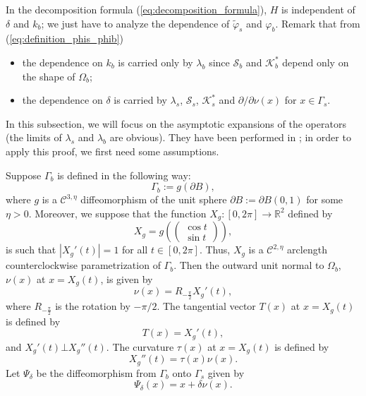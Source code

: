 \documentclass[final]{siamltex}
\numberwithin{equation}{section}
\numberwithin{figure}{section}
\numberwithin{table}{section}
\begin{document}
In the decomposition formula (\ref{eq:decomposition_formula}), $H$
is independent of $\delta$ and $k_{b}$; we just have to analyze
the dependence of $\tilde{\varphi}_{s}$ and $\varphi_{b}$. Remark
that from (\ref{eq:definition_phis_phib})
\begin{itemize}
\item the dependence on $k_{b}$ is carried only by $\lambda_{b}$
since $\mathcal{S}_{b}$ and $\mathcal{K}_{b}^{*}$ depend only on
the shape of $\Omega_{b}$; \item the dependence on $\delta$ is
carried by $\lambda_{s}$, $\mathcal{S}_{s}$, $\mathcal{K}_{s}^{*}$
and $\partial/\partial\nu(x)$ for $x\in\Gamma_{s}$.
\end{itemize}
In this subsection, we will focus on the asymptotic expansions of
the operators (the limits of $\lambda_{s}$ and $\lambda_{b}$ are
obvious). They have been performed in \cite{ammari2010conductivity,zribilayer};
in order to apply this proof, we first need some assumptions.

Suppose $\Gamma_{b}$ is defined in the following way:
\[
\Gamma_{b}:=g\left(\partial B\right),
\]
 where $g$ is a $\mathcal{C}^{3,\eta}$ diffeomorphism of the unit sphere $\partial B:=\partial B(0,1)$
for some $\eta>0$. Moreover, we suppose that the function
$X_g:[0,2\pi]\rightarrow\mathbb{R}^{2}$ defined by
\[
X_g =g\left(\left(\begin{array}{c}
\cos t\\
\sin t
\end{array}\right)\right),
\]
 is such that $\left|X_g'(t)\right|=1$ for all $t\in[0,2\pi]$. Thus,
$X_g$ is a $\mathcal{C}^{2,\eta}$ arclength counterclockwise
parametrization of $\Gamma_{b}$. Then the outward unit normal to
$\Omega_{b}$, $\nu(x)$ at $x=X_g(t)$, is given by
\[
\nu(x)=R_{-\frac{\pi}{2}}X_g'(t),
\]
 where $R_{-\frac{\pi}{2}}$ is the rotation by $-\pi/2$. The tangential
vector $T(x)$ at $x =X_g(t)$ is defined by
\[
T(x)=X_g'(t),
\]
 and $X_g'(t)\bot X_g''(t)$. The curvature $\tau(x)$ at $x=X_g(t)$ is defined
by
\[
X_g''(t)=\tau(x)\nu(x).
\]
 Let $\Psi_{\delta}$ be the diffeomorphism from $\Gamma_{b}$ onto
$\Gamma_{s}$ given by
\begin{equation} \label{defpsidelta}
\Psi_{\delta}(x)=x+\delta\nu(x).\end{equation}
\end{document}
